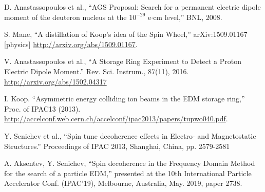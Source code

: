 \documentclass[a4paper]{jacow}
\begin{document}

\begin{thebibliography}{9}
  
  D. Anastassopoulos et al., ``AGS Proposal: Search for a permanent electric dipole moment of
  the deuteron nucleus at the $10^{-29}$ e$\cdot$cm level,'' BNL, 2008.

  S. Mane, ``A distillation of Koop's idea of the Spin Wheel,'' arXiv:1509.01167 [physics]
  \url{http://arxiv.org/abs/1509.01167}.

  V. Anastassopoulos et al., ``A Storage Ring Experiment to Detect a Proton Electric Dipole Moment.''
  Rev. Sci. Instrum., 87(11), 2016.
  \url{http://arxiv.org/abs/1502.04317}

  I. Koop. ``Asymmetric energy colliding ion beams in the EDM storage ring,'' Proc. of IPAC13 (2013).
  \url{http://accelconf.web.cern.ch/accelconf/ipac2013/papers/tupwo040.pdf}.

  Y. Senichev et al., ``Spin tune decoherence effects in Electro- and Magnetostatic Structures.''
  Proceedings of IPAC 2013, Shanghai, China, pp. 2579-2581

  A. Aksentev, Y. Senichev, ``Spin decoherence in the Frequency Domain Method for the search of a particle EDM,''
  presented at the 10th International Particle Accelerator Conf. (IPAC'19), Melbourne, Australia,
  May. 2019, paper 2738.


\end{thebibliography}
\end{document}
